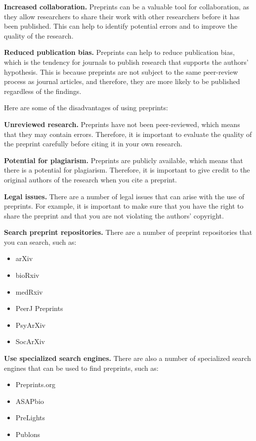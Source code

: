 \documentclass[
]{book}
\begin{document}
\textbf{Increased collaboration.} Preprints can be a valuable tool for collaboration, as they allow researchers to share their work with other researchers before it has been published. This can help to identify potential errors and to improve the quality of the research.

\textbf{Reduced publication bias.} Preprints can help to reduce publication bias, which is the tendency for journals to publish research that supports the authors' hypothesis. This is because preprints are not subject to the same peer-review process as journal articles, and therefore, they are more likely to be published regardless of the findings.

Here are some of the disadvantages of using preprints:

\textbf{Unreviewed research.} Preprints have not been peer-reviewed, which means that they may contain errors. Therefore, it is important to evaluate the quality of the preprint carefully before citing it in your own research.

\textbf{Potential for plagiarism.} Preprints are publicly available, which means that there is a potential for plagiarism. Therefore, it is important to give credit to the original authors of the research when you cite a preprint.

\textbf{Legal issues.} There are a number of legal issues that can arise with the use of preprints. For example, it is important to make sure that you have the right to share the preprint and that you are not violating the authors' copyright.

\textbf{Search preprint repositories.} There are a number of preprint repositories that you can search, such as:

\begin{itemize}
\item
  arXiv
\item
  bioRxiv
\item
  medRxiv
\item
  PeerJ Preprints
\item
  PsyArXiv
\item
  SocArXiv
\end{itemize}

\textbf{Use specialized search engines.} There are also a number of specialized search engines that can be used to find preprints, such as:

\begin{itemize}
\item
  Preprints.org
\item
  ASAPbio
\item
  PreLights
\item
  Publons
\end{itemize}
\end{document}
